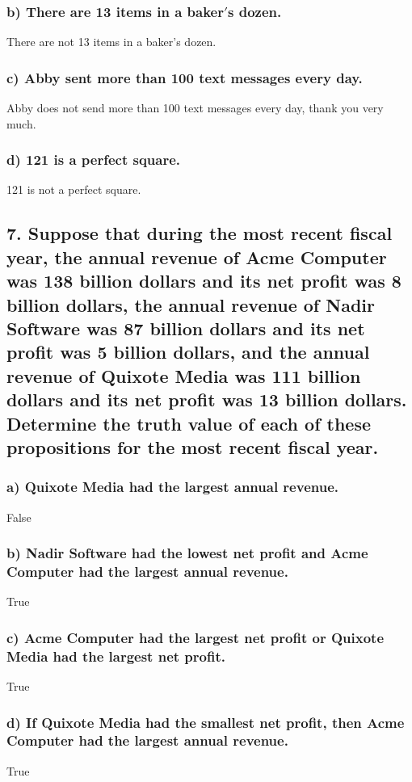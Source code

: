 \documentclass[11pt, oneside]{article} %
\numberwithin{equation}{section} %
\numberwithin{figure}{section} %
\numberwithin{table}{section} %
\begin{document}
\subsubsection{b) There are 13 items in a baker$'$s dozen.}
There are not 13 items in a baker's dozen.
\subsubsection{c) Abby sent more than 100 text messages every day.}
Abby does not send more than 100 text messages every day, thank you very much.
\subsubsection{d) 121 is a perfect square.}
121 is not a perfect square.

\subsection{7. Suppose that during the most recent fiscal year, the annual revenue of Acme Computer was 138 billion dollars and its net profit was 8 billion dollars, the annual revenue of Nadir Software was 87 billion dollars and its net profit was 5 billion dollars, and the annual revenue of Quixote Media was 111 billion dollars and its net profit was 13 billion dollars.\\
Determine the truth value of each of these propositions for the most recent fiscal year.}
\subsubsection{a) Quixote Media had the largest annual revenue.}
False
\subsubsection{b) Nadir Software had the lowest net profit and Acme Computer had the largest annual revenue.}
True
\subsubsection{c) Acme Computer had the largest net profit or Quixote Media had the largest net profit.}
True
\subsubsection{d) If Quixote Media had the smallest net profit, then Acme Computer had the largest annual revenue.}
True
\end{document}

